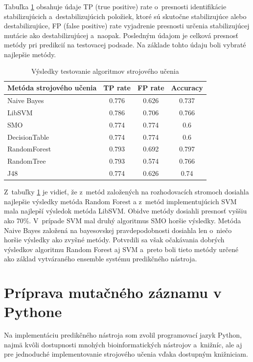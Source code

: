 Tabuľka \ref{testovanie} obsahuje údaje TP (true positive) rate o~presnosti identifikácie stabilizujúcich a~destabilizujúcich položiek, ktoré sú skutočne stabilizujúce alebo destabilizujúce, FP (false positive) rate vyjadrenie presnosti určenia stabilizujúcej mutácie ako destabilizujúcej a~naopak. Posledným údajom je celková presnosť metódy pri predikcií na testovacej podsade. Na základe tohto údaju boli vybraté najlepšie metódy.

\begin{table}[H]
	\centering
	\begin{tabular}{ | l | c | c | c| }
		\hline 
		Metóda strojového učenia & TP rate & FP rate & Accuracy \\ \hline
		Naive Bayes & 0.776 & 0.626 & 0.737 \\ \hline
		LibSVM &  0.786   & 0.706   & 0.766  \\ \hline
		SMO & 0.774 & 0.774 & 0.6\\ \hline
		DecisionTable & 0.774 & 0.774 & 0.6\\ \hline
		RandomForest & 0.793 & 0.692 & 0.797\\ \hline
		RandomTree & 0.793 & 0.574 & 0.766\\ \hline
		J48 & 0.774 & 0.626 & 0.74\\ \hline		
	\end{tabular}
	\caption {Výsledky testovanie algoritmov strojového učenia} \label{testovanie} 
\end{table}

Z~tabuľky \ref{testovanie} je vidieť, že z~metód založených na rozhodovacích stromoch dosiahla najlepšie výsledky metóda Random Forest a z~metód implementujúcich SVM mala najlepší výsledok metóda LibSVM. Obidve metódy dosiahli presnosť vyššiu ako 70\%. V~prípade SVM mal druhý algoritmus SMO horšie výsledky. Metóda Naive Bayes založená na bayesovskej pravdepodobnosti dosiahla len o~niečo horšie výsledky ako zvyšné metódy. Potvrdili sa však očakávania dobrých výsledkov algoritmu Random Forest aj SVM a~preto boli tieto metódy určené ako základ vytváraného ensemble systému predikčného nástroja.

\section{Príprava mutačného záznamu v Pythone}

Na implementáciu predikčného nástroja som zvolil programovací jazyk Python, najmä kvôli dostupnosti mnohých bioinformatických nástrojov a~knižníc, ale aj pre jednoduché implementovanie strojového učenia vďaka dostupným knižniciam.

